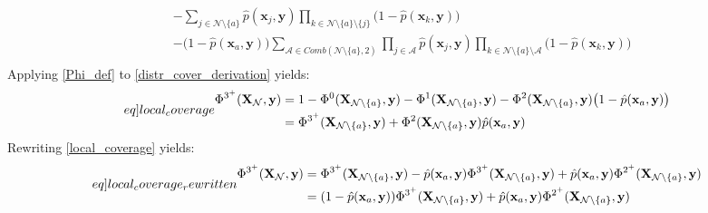 \begin{appendices}
\begin{equation}
\begin{split}
      &- \sum_{j\in\mathcal{N}\setminus\{a\}}\hat{p}(\mathbf{x}_{j}, \mathbf{y})\prod_{k\in\mathcal{N}\setminus\{a\}\setminus\{j\}}\big(1-\hat{p}(\mathbf{x}_{k}, \mathbf{y})\big)\\
      &- \big(1-\hat{p}(\mathbf{x}_{a}, \mathbf{y})\big)\sum_{\mathcal{A}\in Comb(\mathcal{N}\setminus\{a\}, 2)}\prod_{j\in\mathcal{A}}\hat{p}(\mathbf{x}_{j}, \mathbf{y})\prod_{k\in\mathcal{N}\setminus\{a\}\setminus\mathcal{A}}\big(1-\hat{p}(\mathbf{x}_{k}, \mathbf{y})\big)\\
    \end{split}
  \end{equation}
  Applying \eqref{Phi_def} to \eqref{distr_cover_derivation} yields:
  \begin{equation}\label[eq]{local_coverage}
    \begin{split}
      \Phi^{3^{+}}(\mathbf{X}_{\mathcal{N}}, \mathbf{y}) &= 1 - \Phi^{0}(\mathbf{X}_{\mathcal{N}\setminus\{a\}}, \mathbf{y}) - \Phi^{1}(\mathbf{X}_{\mathcal{N}\setminus\{a\}}, \mathbf{y}) - \Phi^{2}(\mathbf{X}_{\mathcal{N}\setminus\{a\}}, \mathbf{y})\big(1-\hat{p}(\mathbf{x}_{a}, \mathbf{y})\big)\\
      &= \Phi^{3^{+}}(\mathbf{X}_{\mathcal{N}\setminus\{a\}}, \mathbf{y}) + \Phi^{2}(\mathbf{X}_{\mathcal{N}\setminus\{a\}}, \mathbf{y})\hat{p}(\mathbf{x}_{a}, \mathbf{y})\\
    \end{split}
  \end{equation}
  Rewriting \eqref{local_coverage} yields:
  \begin{equation}\label[eq]{local_coverage_rewritten}
    \begin{split}
      \Phi^{3^{+}}(\mathbf{X}_{\mathcal{N}}, \mathbf{y}) &= \Phi^{3^{+}}(\mathbf{X}_{\mathcal{N}\setminus\{a\}}, \mathbf{y}) - \hat{p}(\mathbf{x}_{a}, \mathbf{y})\Phi^{3^{+}}(\mathbf{X}_{\mathcal{N}\setminus\{a\}}, \mathbf{y}) + \hat{p}(\mathbf{x}_{a}, \mathbf{y})\Phi^{2^{+}}(\mathbf{X}_{\mathcal{N}\setminus\{a\}}, \mathbf{y})\\
      &= (1-\hat{p}(\mathbf{x}_{a}, \mathbf{y}))\Phi^{3^{+}}(\mathbf{X}_{\mathcal{N}\setminus\{a\}}, \mathbf{y}) + \hat{p}(\mathbf{x}_{a}, \mathbf{y})\Phi^{2^{+}}(\mathbf{X}_{\mathcal{N}\setminus\{a\}}, \mathbf{y})\\
    \end{split}
  \end{equation}
  \resumetocwriting
\end{appendices}